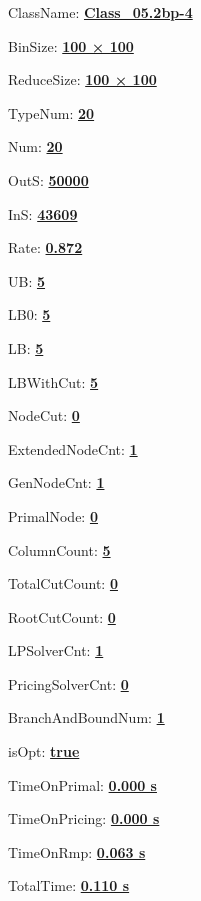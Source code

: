 \documentclass[11pt]{article}
\begin{document}
\pagestyle{empty}


ClassName: \underline{\textbf{Class_05.2bp-4}}
\par
BinSize: \underline{\textbf{100 × 100}}
\par
ReduceSize: \underline{\textbf{100 × 100}}
\par
TypeNum: \underline{\textbf{20}}
\par
Num: \underline{\textbf{20}}
\par
OutS: \underline{\textbf{50000}}
\par
InS: \underline{\textbf{43609}}
\par
Rate: \underline{\textbf{0.872}}
\par
UB: \underline{\textbf{5}}
\par
LB0: \underline{\textbf{5}}
\par
LB: \underline{\textbf{5}}
\par
LBWithCut: \underline{\textbf{5}}
\par
NodeCut: \underline{\textbf{0}}
\par
ExtendedNodeCnt: \underline{\textbf{1}}
\par
GenNodeCnt: \underline{\textbf{1}}
\par
PrimalNode: \underline{\textbf{0}}
\par
ColumnCount: \underline{\textbf{5}}
\par
TotalCutCount: \underline{\textbf{0}}
\par
RootCutCount: \underline{\textbf{0}}
\par
LPSolverCnt: \underline{\textbf{1}}
\par
PricingSolverCnt: \underline{\textbf{0}}
\par
BranchAndBoundNum: \underline{\textbf{1}}
\par
isOpt: \underline{\textbf{true}}
\par
TimeOnPrimal: \underline{\textbf{0.000 s}}
\par
TimeOnPricing: \underline{\textbf{0.000 s}}
\par
TimeOnRmp: \underline{\textbf{0.063 s}}
\par
TotalTime: \underline{\textbf{0.110 s}}
\par
\newpage


\end{document}
